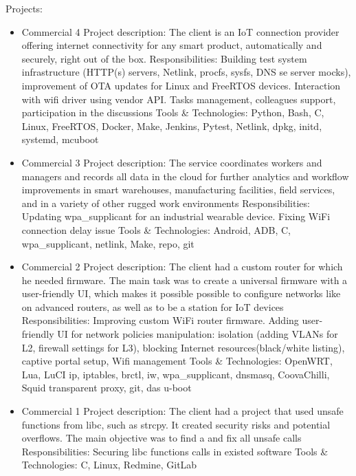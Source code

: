 \vintent

Projects:
\begin{itemize}
    \item Commercial 4\break
    Project description:\break
    The client is an IoT connection provider offering internet connectivity for any
    smart product, automatically and securely, right out of the box.\break
    Responsibilities:\break
    Building test system infrastructure (HTTP(s) servers, Netlink, procfs, sysfs, DNS
    se server mocks), improvement of OTA updates for Linux and FreeRTOS devices.
    Interaction with wifi driver using vendor API. Tasks management, colleagues
    support, participation in the discussions\break
    Tools \& Technologies:\break
    Python, Bash, C, Linux, FreeRTOS, Docker, Make, Jenkins, Pytest, Netlink, dpkg,
    initd, systemd, mcuboot
    \item Commercial 3\break
    Project description:\break
    The service coordinates workers and managers and records all data in the
    cloud for further analytics and workflow improvements in smart warehouses,
    manufacturing facilities, field services, and in a variety of other rugged work
    environments\break
    Responsibilities:\break
    Updating wpa\_supplicant for an industrial wearable device. Fixing WiFi
    connection delay issue
    Tools \& Technologies:\break
    Android, ADB, C, wpa\_supplicant, netlink, Make, repo, git
    \item Commercial 2\break
    Project description:\break
    The client had a custom router for which he needed firmware. The main task
    was to create a universal firmware with a user-friendly UI, which makes it
    possible possible to configure networks like on advanced routers, as well as to be a
    station for IoT devices\break
    Responsibilities:\break
    Improving custom WiFi router firmware. Adding user-friendly UI for network
    policies manipulation: isolation (adding VLANs for L2, firewall settings for L3),
    blocking Internet resources(black/white listing), captive portal setup,
    Wifi management\break
    Tools \& Technologies:\break
    OpenWRT, Lua, LuCI ip, iptables, brctl, iw, wpa\_supplicant, dnsmasq, CoovaChilli,
    Squid transparent proxy, git, das u-boot
    \item Commercial 1\break
    Project description:\break
    The client had a project that used unsafe functions from libc, such as strcpy. It
    created security risks and potential overflows. The main objective was to find
    a and fix all unsafe calls\break
    Responsibilities:\break
    Securing libc functions calls in existed software\break
    Tools \& Technologies:\break
    C, Linux, Redmine, GitLab
\end{itemize}
